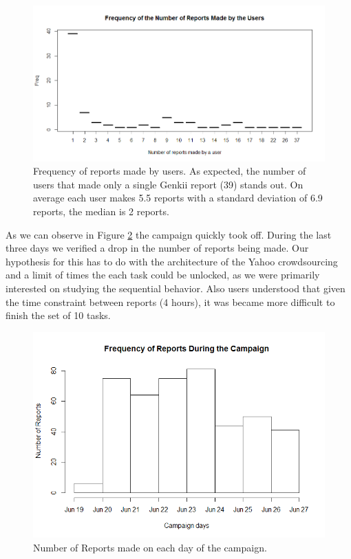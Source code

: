 \documentclass[letterpaper]{article}
\begin{document}
\begin{figure}[htb]
	\begin{center}
		\includegraphics[width=1\linewidth]{images/FReports}
		\caption{Frequency of reports made by users. As expected, the number of users that made only a single Genkii report (39) stands out. On average each user makes 5.5 reports with a standard deviation of 6.9 reports, the median is 2 reports.\label{fig:freqreports1}}
	\end{center}
\end{figure}

As we can observe in Figure \ref{fig:freqreportsperday1} the campaign quickly took off. During the last three days we verified a drop in the number of reports being made. Our hypothesis for this has to do with the architecture of the Yahoo crowdsourcing and a limit of times the each task could be unlocked, as we were primarily interested on studying the sequential behavior. Also users understood that given the time constraint between reports (4 hours), it was became more difficult to finish the set of 10 tasks.

\begin{figure}[htb]
	\begin{center}
		\includegraphics[width=1\linewidth]{images/RPerDay}
		\caption{Number of Reports made on each day of the campaign.\label{fig:freqreportsperday1}}
	\end{center}
\end{figure}
\end{document}
